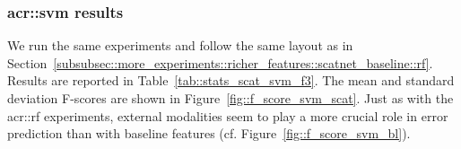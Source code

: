         \subsubsection{\texorpdfstring{\acrshort*{acr::svm}}{SVM} results}
            \label{subsubsec::more_experiments::richer_features::scatnet_baseline::svm}
            We run the same experiments and follow the same layout as in Section~\ref{subsubsec::more_experiments::richer_features::scatnet_baseline::rf}.
            Results are reported in Table~\ref{tab::stats_scat_svm_f3}.
            The mean and standard deviation F-scores are shown in Figure~\ref{fig::f_score_svm_scat}.
            Just as with the \gls{acr::rf} experiments, external modalities seem to play a more crucial role in error prediction than with baseline features (cf. Figure~\ref{fig::f_score_svm_bl}).\\


